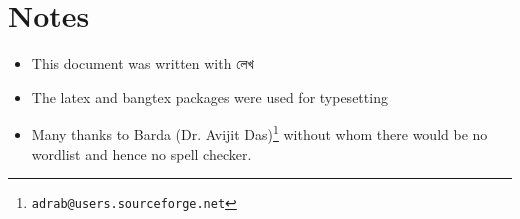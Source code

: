 \documentclass[11pt]{article}
\begin{document}
\section{Notes}
\begin{itemize}
\item This document was written with {\lbng লেখ} 
\item The latex and bangtex packages were used for typesetting
\item Many thanks to Barda (Dr. Avijit Das)\footnote{{\tt adrab@users.sourceforge.net}} without whom there would be no wordlist and hence no spell checker.
\end{itemize}
\begin{center}
\end{center}
\end{document}
